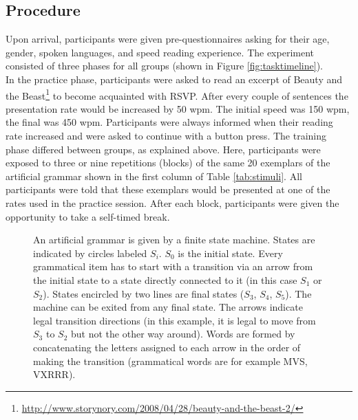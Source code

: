 \subsection{Procedure}
Upon arrival, participants were given pre-questionnaires asking for their age, gender, spoken languages, and speed reading experience.
The experiment consisted of three phases for all groups (shown in Figure \ref{fig:tasktimeline}). \\
In the practice phase, participants were asked to read an excerpt of Beauty and the Beast\footnote{\url{http://www.storynory.com/2008/04/28/beauty-and-the-beast-2/}} to become acquainted with RSVP. After every couple of sentences the presentation rate would be increased by 50 wpm. The initial speed was 150 wpm, the final was 450 wpm. Participants were always informed when their reading rate increased and were asked to continue with a button press.
The training phase differed between groups, as explained above. Here, participants were exposed to three or nine repetitions (blocks) of the same 20 exemplars of the artificial grammar shown in the first column of Table \ref{tab:stimuli}. All participants were told that these exemplars would be presented at one of the rates used in the practice session. After each block, participants were given the opportunity to take a self-timed break.
\begin{figure}
\centering
\hspace*{-1.55cm}
\caption{An artificial grammar is given by a finite state machine. States are indicated by circles labeled $S_{i}$. $S_{0}$ is the initial state. Every grammatical item has to start with a transition via an arrow from the initial state to a state directly connected to it (in this case $S_{1}$ or $S_{2}$). States encircled by two lines are final states ($S_{3}$, $S_{4}$, $S_{5}$). The machine can be exited from any final state. The arrows indicate legal transition directions (in this example, it is legal to move from $S_{3}$ to $S_{2}$ but not the other way around). Words are formed by concatenating the letters assigned to each arrow in the order of making the transition (grammatical words are for example MVS, VXRRR).} 
\label{fig:grammar}
\end{figure}
